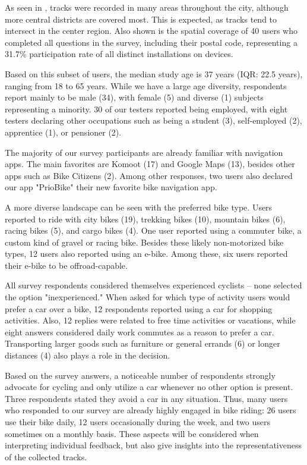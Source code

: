 As seen in , tracks were recorded in many areas throughout the city, although more central districts are covered most. This is expected, as tracks tend to intersect in the center region. Also shown is the spatial coverage of 40 users who completed all questions in the survey, including their postal code, representing a 31.7\% participation rate of all distinct installations on devices.

Based on this subset of users, the median study age is 37 years (IQR: 22.5 years), ranging from 18 to 65 years. While we have a large age diversity, respondents report mainly to be male (34), with female (5) and diverse (1) subjects representing a minority. 30 of our testers reported being employed, with eight testers declaring other occupations such as being a student (3), self-employed (2), apprentice (1), or pensioner (2).

The majority of our survey participants are already familiar with navigation apps. The main favorites are Komoot (17) and Google Maps (13), besides other apps such as Bike Citizens (2). Among other responses, two users also declared our app "PrioBike" their new favorite bike navigation app. 

A more diverse landscape can be seen with the preferred bike type. Users reported to ride with city bikes (19), trekking bikes (10), mountain bikes (6), racing bikes (5), and cargo bikes (4). One user reported using a commuter bike, a custom kind of gravel or racing bike. Besides these likely non-motorized bike types, 12 users also reported using an e-bike. Among these, six users reported their e-bike to be offroad-capable. 

All survey respondents considered themselves experienced cyclists -- none selected the option "inexperienced." When asked for which type of activity users would prefer a car over a bike, 12 respondents reported using a car for shopping activities. Also, 12 replies were related to free time activities or vacations, while eight answers considered daily work commutes as a reason to prefer a car. Transporting larger goods such as furniture or general errands (6) or longer distances (4) also plays a role in the decision. 

Based on the survey answers, a noticeable number of respondents strongly advocate for cycling and only utilize a car whenever no other option is present. Three respondents stated they avoid a car in any situation. Thus, many users who responded to our survey are already highly engaged in bike riding: 26 users use their bike daily, 12 users occasionally during the week, and two users sometimes on a monthly basis. These aspects will be considered when interpreting individual feedback, but also give insights into the representativeness of the collected tracks.

